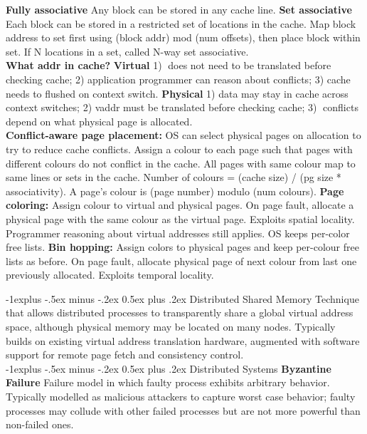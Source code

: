 \documentclass[9pt,landscape]{article}
\makeatletter
\renewcommand{\subsection}{\@startsection{subsection}{2}{0mm}%
                                {-1explus -.5ex minus -.2ex}%
                                {0.5ex plus .2ex}%
                                {\normalfont\normalsize\bfseries}}
\makeatother
\begin{document}
\begin{multicols}{3}
{\bf Fully associative} Any block can be stored in any cache line.
{\bf Set associative} Each block can be stored in a restricted set of locations in the cache.
Map block address to set first using (block addr) mod (num offsets), then place block within set. If N locations in a set, called N-way set associative.\\
{\bf What addr in cache?} {\bf Virtual} 1) 􏱃does not need to be translated before checking cache; 2) application programmer can reason about conflicts; 3) cache needs to flushed on context switch. {\bf Physical} 1) data may stay in cache across context switches; 2) vaddr must be translated before checking cache; 3) 􏱄conflicts depend on what physical page is allocated.\\
{\bf Conflict-aware page placement:} OS can select physical pages on allocation to try to reduce cache conflicts. Assign a colour to each page such that pages with different colours do not conflict in the cache. All pages with same colour map to same lines or sets in the cache. Number of colours = (cache size) / (pg size * associativity). A page's colour is (page number) modulo (num colours).
{\bf Page coloring:} Assign colour to virtual and physical pages. On page fault, allocate a physical page with the same colour as the virtual page. Exploits spatial locality. Programmer reasoning about virtual addresses still applies. OS keeps per-color free lists.
{\bf Bin hopping:} Assign colors to physical pages and keep per-colour free lists as before. On page fault, allocate physical page of next colour from last one previously allocated. Exploits temporal locality.

\subsection{Distributed Shared Memory}
Technique that allows distributed processes to transparently 
share a global virtual address space, although physical memory may be located on many nodes. 
Typically builds on existing virtual address translation hardware, 
augmented with software support for remote page fetch and consistency control.\\

\subsection{Distributed Systems}
{\bf Byzantine Failure} Failure model in which faulty process exhibits arbitrary behavior. 
Typically modelled as malicious attackers to capture worst case behavior; 
faulty processes may collude with other failed processes but are not more 
powerful than non-failed ones.\\


\end{multicols}
\end{document}
